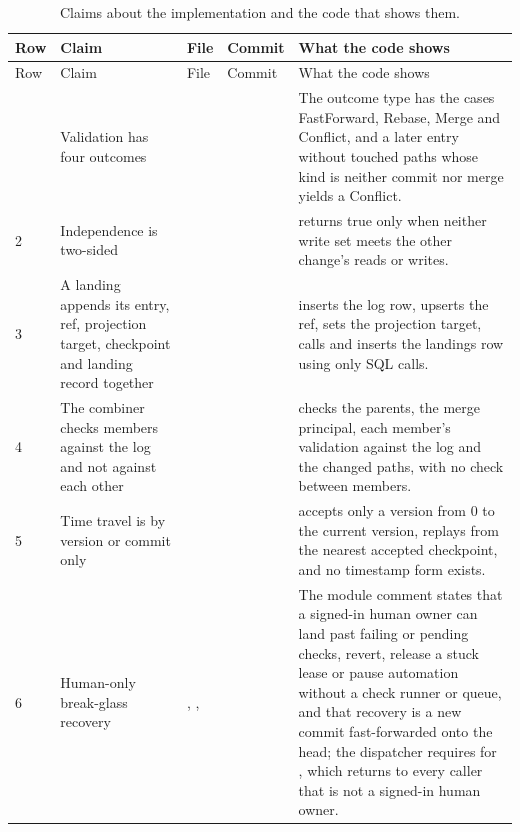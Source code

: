 \documentclass[11pt,letterpaper]{article}
\theoremstyle{definition}
\theoremstyle{remark}
\begin{document}
\begin{small}
\begin{longtable}{@{}L{0.7cm}L{3.2cm}L{4.0cm}L{1.3cm}L{4.8cm}@{}}
\caption{Claims about the implementation and the code that shows them.}\label{tab:syn:evidence}\\
\toprule
Row & Claim & File & Commit & What the code shows \\
\midrule
\endfirsthead
\toprule
Row & Claim & File & Commit & What the code shows \\
\midrule
\endhead
\bottomrule
{} & Validation has four outcomes &  &  & The outcome type has the cases FastForward, Rebase, Merge and Conflict, and a later entry without touched paths whose kind is neither commit nor merge yields a Conflict. \\
2 & Independence is two-sided &  &  &  returns true only when neither write set meets the other change's reads or writes. \\
3 & A landing appends its entry, ref, projection target, checkpoint and landing record together &  &  &  inserts the log row, upserts the ref, sets the projection target, calls  and inserts the landings row using only SQL calls. \\
4 & The combiner checks members against the log and not against each other &  &  &  checks the parents, the merge principal, each member's validation against the log and the changed paths, with no check between members. \\
5 & Time travel is by version or commit only &  &  &  accepts only a version from 0 to the current version,  replays from the nearest accepted checkpoint, and no timestamp form exists. \\
6 & Human-only break-glass recovery & , ,  &  & The module comment states that a signed-in human owner can land past failing or pending checks, revert, release a stuck lease or pause automation without a check runner or queue, and that recovery is a new commit fast-forwarded onto the head; the dispatcher requires  for , which returns  to every caller that is not a signed-in human owner. \\

\end{longtable}
\end{small}
\end{document}
